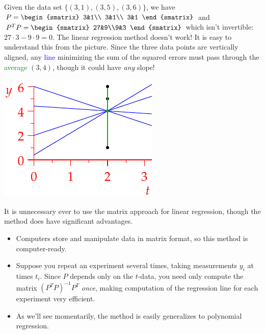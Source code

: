 \begin{examples}{}{}
\begin{enumerate}\setcounter{enumi}{1}
  \begin{minipage}[t]{0.65\linewidth}\vspace{0pt}
  \item Given the data set $\{(3,1),(3,5),(3,6)\}$, we have $P=\begin{smatrix}
   3&1\\
   3&1\\
   3&1
   \end{smatrix}$ and $P^TP=\begin{smatrix}
   27&9\\9&3
   \end{smatrix}$ which isn't invertible: $27\cdot 3-9\cdot 9=0$. The linear regression method doesn't work!\smallbreak
   It is easy to understand this from the picture. Since the three data points are vertically aligned, any \textcolor{blue}{line} minimizing the sum of the squared errors must pass through the \textcolor{Green}{average} $(3,4)$, though it could have \emph{any} slope!
  \end{minipage}\begin{minipage}[t]{0.35\linewidth}\vspace{0pt}
  \flushright\includegraphics{reg-line6}
  \end{minipage}
\end{enumerate}
\end{examples}

It is unnecessary ever to use the matrix approach for linear regression, though the method does have significant advantages.
\begin{itemize}%
  \item Computers store and manipulate data in matrix format, so this method is computer-ready.
  \item Suppose you repeat an experiment several times, taking measurements $y_i$ at times $t_i$. Since $P$ depends only on the $t$-data, you need only compute the matrix $(P^TP)^{-1}P^T$ \emph{once}, making computation of the regression line for each experiment very efficient. 
  \item As we'll see momentarily, the method is easily generalizes to polynomial regression.
\end{itemize}

